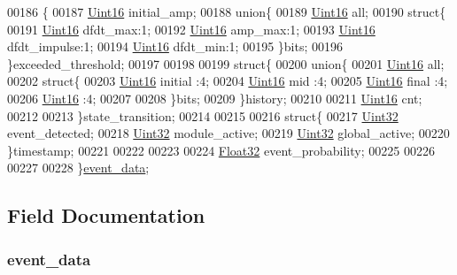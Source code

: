 \begin{DoxyCode}
00186    \{
00187      \hyperlink{a00072_a59a9f6be4562c327cbfb4f7e8e18f08b}{Uint16}                     initial\_amp;
00188     \textcolor{keyword}{union}\{
00189         \hyperlink{a00072_a59a9f6be4562c327cbfb4f7e8e18f08b}{Uint16} all;
00190         \textcolor{keyword}{struct}\{
00191             \hyperlink{a00072_a59a9f6be4562c327cbfb4f7e8e18f08b}{Uint16} dfdt\_max:1;
00192             \hyperlink{a00072_a59a9f6be4562c327cbfb4f7e8e18f08b}{Uint16} amp\_max:1;
00193             \hyperlink{a00072_a59a9f6be4562c327cbfb4f7e8e18f08b}{Uint16} dfdt\_impulse:1;
00194             \hyperlink{a00072_a59a9f6be4562c327cbfb4f7e8e18f08b}{Uint16} dfdt\_min:1;
00195         \}bits;
00196     \}exceeded\_threshold;
00197 
00198 
00199     \textcolor{keyword}{struct}\{
00200     \textcolor{keyword}{union}\{
00201         \hyperlink{a00072_a59a9f6be4562c327cbfb4f7e8e18f08b}{Uint16} all;
00202         \textcolor{keyword}{struct}\{
00203             \hyperlink{a00072_a59a9f6be4562c327cbfb4f7e8e18f08b}{Uint16} initial  :4;
00204             \hyperlink{a00072_a59a9f6be4562c327cbfb4f7e8e18f08b}{Uint16} mid      :4;
00205             \hyperlink{a00072_a59a9f6be4562c327cbfb4f7e8e18f08b}{Uint16} \textcolor{keyword}{final}    :4;
00206             \hyperlink{a00072_a59a9f6be4562c327cbfb4f7e8e18f08b}{Uint16}          :4;
00207   
00208         \}bits;
00209     \}history;
00210 
00211     \hyperlink{a00072_a59a9f6be4562c327cbfb4f7e8e18f08b}{Uint16} cnt;
00212 
00213     \}state\_transition;
00214 
00215 
00216     \textcolor{keyword}{struct}\{
00217      \hyperlink{a00072_aba99025e657f892beb7ff31cecf64653}{Uint32}                    event\_detected;
00218      \hyperlink{a00072_aba99025e657f892beb7ff31cecf64653}{Uint32}                    module\_active;
00219      \hyperlink{a00072_aba99025e657f892beb7ff31cecf64653}{Uint32}                    global\_active;
00220     \}timestamp;
00221 
00222 
00223 
00224     \hyperlink{a00072_a87d38f886e617ced2698fc55afa07637}{Float32}                    event\_probability;
00225 
00226     
00227 
00228     \}\hyperlink{a00028_a8c0bda69e71ef674e60da47ad0be9ab0}{event\_data};
\end{DoxyCode}


\subsection{Field Documentation}
\hypertarget{a00028_a8c0bda69e71ef674e60da47ad0be9ab0}{
\subsubsection[{event\+\_\+data}]{\setlength{\rightskip}{0pt plus 5cm}event\+\_\+data}}\label{a00028_a8c0bda69e71ef674e60da47ad0be9ab0}


